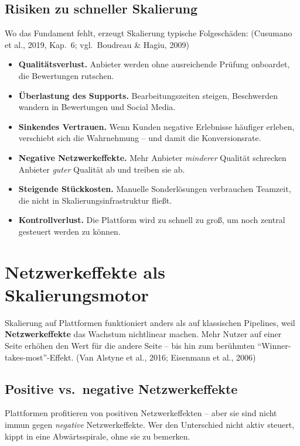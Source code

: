 \documentclass[11pt,a4paper,oneside]{article}
\newcommand{\fachbegriff}[1]{\textbf{#1}}
\newcommand{\quelle}[1]{{\footnotesize\color{lpGray}(#1)}}
\begin{document}
\subsection{Risiken zu schneller Skalierung}

Wo das Fundament fehlt, erzeugt Skalierung typische Folgeschäden: \quelle{Cusumano et al., 2019, Kap.~6; vgl.\ Boudreau \& Hagiu, 2009}

\begin{itemize}
  \item \textbf{Qualitätsverlust.} Anbieter werden ohne ausreichende Prüfung onboardet, die Bewertungen rutschen.
  \item \textbf{Überlastung des Supports.} Bearbeitungszeiten steigen, Beschwerden wandern in Bewertungen und Social Media.
  \item \textbf{Sinkendes Vertrauen.} Wenn Kunden negative Erlebnisse häufiger erleben, verschiebt sich die Wahrnehmung -- und damit die Konversionsrate.
  \item \textbf{Negative Netzwerkeffekte.} Mehr Anbieter \emph{minderer} Qualität schrecken Anbieter \emph{guter} Qualität ab und treiben sie ab.
  \item \textbf{Steigende Stückkosten.} Manuelle Sonderlösungen verbrauchen Teamzeit, die nicht in Skalierungsinfrastruktur fließt.
  \item \textbf{Kontrollverlust.} Die Plattform wird zu schnell zu groß, um noch zentral gesteuert werden zu können.
\end{itemize}

\section{Netzwerkeffekte als Skalierungsmotor}

Skalierung auf Plattformen funktioniert anders als auf klassischen Pipelines, weil \fachbegriff{Netzwerkeffekte} das Wachstum nichtlinear machen. Mehr Nutzer auf einer Seite erhöhen den Wert für die andere Seite -- bis hin zum berühmten ``Winner-takes-most''-Effekt. \quelle{Van Alstyne et al., 2016; Eisenmann et al., 2006}

\subsection{Positive vs.\ negative Netzwerkeffekte}

Plattformen profitieren von positiven Netzwerkeffekten -- aber sie sind nicht immun gegen \emph{negative} Netzwerkeffekte. Wer den Unterschied nicht aktiv steuert, kippt in eine Abwärtsspirale, ohne sie zu bemerken.
\end{document}
